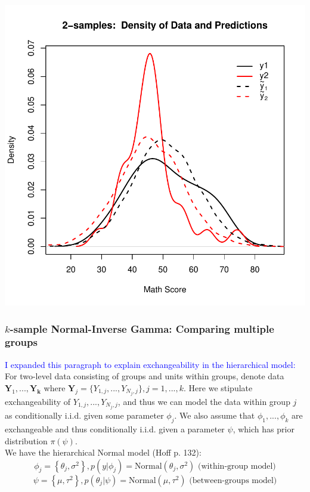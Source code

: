 \documentclass[12pt, a4paper]{article}
\begin{document}
\includegraphics{Thesis_v4-008}


    \subsubsection{$k$-sample Normal-Inverse Gamma:  Comparing multiple groups}
    \textcolor{blue}{I expanded this paragraph to explain exchangeability in the hierarchical model:}\\
    For two-level data consisting of groups and units within groups, denote data $\mathbf{Y}_1,...,\mathbf{Y_k}$ where $\mathbf{Y}_j = \{Y_{1,j},...,Y_{N_j,j}\}, j=1,...,k$. Here we stipulate exchangeability of $Y_{1,j},...,Y_{N_j,j}$, and thus we can model the data within group $j$ as conditionally i.i.d. given some parameter $\phi_j$.  We also assume that $\phi_1,...,\phi_k$ are exchangeable and thus conditionally i.i.d. given a parameter $\psi$, which has prior distribution $\pi(\psi)$.\\

\noindent We have the hierarchical Normal model (Hoff p. 132):
    $$\phi_j = \left\{\theta_j,\sigma^2\right\}, p\left(y|\phi_j\right) = \text{Normal}\left(\theta_j,\sigma^2\right) \text{ (within-group model)}$$
    $$\psi = \left\{\mu,\tau^2\right\}, p\left(\theta_j|\psi\right) = \text{Normal}\left(\mu,\tau^2\right) \text{ (between-groups model)}$$
\end{document}
